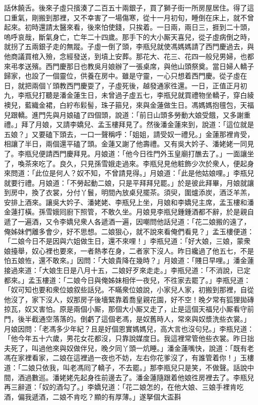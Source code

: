 話休饒舌。後來子虛只擯湊了二百五十兩銀子，買了獅子街一所房屋居住。得了這口重氣，剛搬到那裡，又不幸害了一場傷寒，從十一月初旬，睡倒在床上，就不曾起來。初時還請太醫來看，後來怕使錢，只挨着。一日兩，兩日三，捱到二十頭，嗚呼哀哉，斷氣身亡，亡年二十四歲。{}那手下的大小厮天喜兒，從子虛病倒之時，就拐了五兩銀子走的無蹤。子虛一倒了頭，李瓶兒就使馮媽媽請了西門慶過去，與他商議買棺入殮，念經發送，到墳上安葬。那花大、花三、花四一般兒男婦，也都來弔孝送殯。{}西門慶那日也教吳月娘辦了一張桌席，與他山頭祭奠。當日婦人轎子歸家，也設了一個靈位，供養在房中。雖是守靈，一心只想着西門慶。從子虛在日，就把兩個丫頭教西門慶耍了，子虛死後，越發通家徃還。一日，正值正月初九，李瓶兒打聽是潘金蓮生日，未曾過子虛五七，李瓶兒就買禮物坐轎子，穿白綾襖兒，藍織金裙，白紵布鬏髻，珠子箍兒，來與金蓮做生日。馮媽媽抱氊包，天福兒跟轎。進門先與月娘磕了四個頭，說道：「前日山頭多勞動大娘受餓，又多謝重禮。」拜了月娘，又請李嬌兒、孟玉樓拜見了。然後潘金蓮來到，說道：「這位就是五娘？」{}又要磕下頭去，一口一聲稱呼：「姐姐，{}請受奴一禮兒。」金蓮那裡肯受，相讓了半日，兩個還平磕了頭。金蓮又謝了他壽禮。又有吳大妗子、潘姥姥一同見了。{}李瓶兒便請西門慶拜見。月娘道：「他今日徃門外玉皇廟打醮去了。」一面讓坐了，喚茶來吃了。良久，只見孫雪娥走過來。李瓶兒見他粧飾少次於衆人，便起身來問道：「此位是何人？奴不知，不曾請見得。」月娘道：「此是他姑娘哩。」李瓶兒就要行禮。月娘道：「不勞起動二娘，只是平拜拜兒罷。」於是彼此拜畢，月娘就讓到房中，換了衣裳，分付丫鬟，明間內放桌兒擺茶。須臾，圍爐添炭，酒泛羊羔，安排上酒來。讓吳大妗子、潘姥姥、李瓶兒上坐，月娘和李嬌兒主席，孟玉樓和潘金蓮打橫。孫雪娥囘廚下照管，不敢久坐。月娘見李瓶兒鍾鍾酒都不辭，於是親自遞了一遍酒，又令李嬌兒衆人各遞酒一遍，因嘲問他話兒道：「花二娘搬的遠了，俺姊妹們離多會少，好不思想。二娘狠心，就不說來看俺們看見？」孟玉樓便道：「二娘今日不是因與六姐做生日，還不來哩！」李瓶兒道：「好大娘，三娘，蒙衆娘擡舉，{}奴心裡也要來，一者熱孝在身，二者家下沒人。昨日纔過了他五七，不是怕五娘恠，還不敢來。」因問：「大娘貴降在幾時？」月娘道：「賤日早哩。」潘金蓮接過來道：「大娘生日是八月十五，二娘好歹來走走。」李瓶兒道：「不消說，已定都來。」孟玉樓道：「二娘今日與俺姊妹相伴一夜兒，不徃家去罷了。」李瓶兒道：「奴可知也要和衆位娘叙些話兒。不瞞衆位娘說，小家兒人家，初搬到那裡，自從他沒了，家下沒人，奴那房子後墻緊靠着喬皇親花園，好不空！{}晚夕常有狐狸拋磚掠瓦，奴又害怕。原是兩個小厮，那個大小厮又走了，止是這個天福兒小厮看守前門，後半截通空落落的。倒虧了這個老馮，是奴舊時人，常來與奴漿洗些衣裳。」月娘因問：「老馮多少年紀？且是好個恩實媽媽兒，高大言也沒句兒。」李瓶兒道：「他今年五十六歲，男花女花都沒，只靠說媒度日。我這裡常管他些衣裳。昨日拙夫死了，叫過他來與奴做伴兒，晚夕同丫頭一炕睡。」潘金蓮嘴快，說道：「既有老馮在家裡看家，二娘在這裡過一夜也不妨，左右你花爹沒了，有誰管着你！」{}玉樓道：「二娘只依我，叫老馮囘了轎子，不去罷。」那李瓶兒只是笑，不做聲。{}話說中間，酒過數巡。潘姥姥先起身徃前邊去了。潘金蓮隨跟着他娘徃房裡去了。李瓶兒再三辭道：「奴的酒勾了。」李嬌兒道：「花二娘怎的，在他大娘、三娘手裡肯吃酒，偏我遞酒，二娘不肯吃？顯的有厚薄。」遂拏個大盃斟